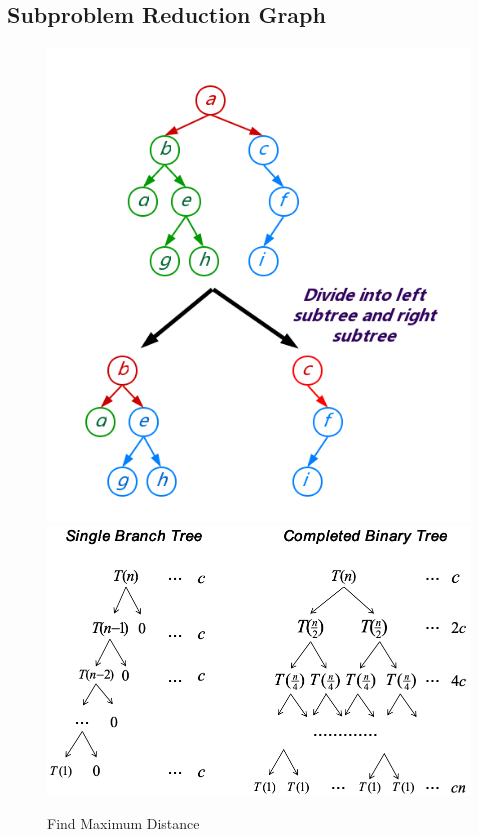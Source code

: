 \documentclass[UTF8,a4paper,12pt]{article}
\begin{document}
	\subsection{Subproblem Reduction Graph}
	\begin{figure}[htb]
		\centering
		\includegraphics[scale=.5]{./pictures/alg1/problem2-1.png}
		\includegraphics[scale=.45]{./pictures/alg1/problem2-2.png}
		\caption{Find Maximum Distance}
	\end{figure}
\end{document}
